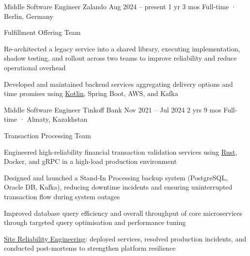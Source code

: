 \documentclass[11pt, a4paper]{style}
\begin{document}
\setcolumnwidth{5.5cm,2.6cm}
\begin{paracol}{2}



    \cvEntry
        {Middle Software Engineer} {Zalando}
        {Aug 2024 -- present} {1 yr 3 mos}
        {Full-time · Berlin, Germany}
        {
            Fulfillment Offering Team \\
            \vspace{-5mm}
            \begin{cvItems}
                \item Re-architected a legacy service into a shared library, executing implementation, shadow testing, and rollout across two teams to improve reliability and reduce operational overhead
                \item Developed and maintained backend services aggregating delivery options and time promises using \underline{Kotlin}, Spring Boot, AWS, and Kafka
            \end{cvItems}
        }

    \cvEntry
        {Middle Software Engineer} {Tinkoff Bank}
        {Nov 2021 -- Jul 2024} {2 yrs 9 mos}
        {Full-time · Almaty, Kazakhstan}
        {
            Transaction Processing Team \\
            \vspace{-5mm}
            \begin{cvItems}
                \item Engineered high-reliability financial transaction validation services using \underline{Rust}, Docker, and gRPC in a high-load production environment
                \item Designed and launched a Stand-In Processing backup system (PostgreSQL, Oracle DB, Kafka), reducing downtime incidents and ensuring uninterrupted transaction flow during system outages
                \item Improved database query efficiency and overall throughput of core microservices through targeted query optimisation and performance tuning
                \item \underline{Site Reliability Engineering}: deployed services, resolved production incidents, and conducted post-mortems to strengthen platform resilience
            \end{cvItems}
        }


\end{paracol}
\end{document}
